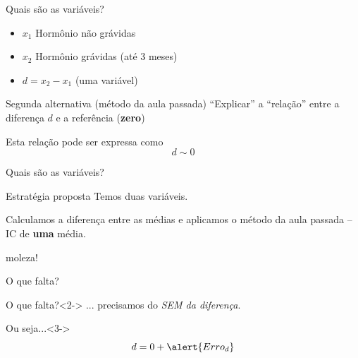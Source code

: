 \documentclass{beamer}
\begin{document}
\begin{frame}{Quais são as variáveis?}
  \begin{itemize}
  \item $x_1$ Hormônio não grávidas
  \item $x_2$ Hormônio grávidas (até 3 meses)
  \item $d = x_2 - x _1$ (uma variável)
  \end{itemize}
  \begin{block}{Segunda alternativa (método da aula passada)}
    \small
    ``Explicar'' a ``relação'' entre a diferença $d$ e a referência ({\bf zero})
  \end{block}
  \begin{block}{Esta relação pode ser expressa como}
    \begin{displaymath}
      d \sim 0
    \end{displaymath}
  \end{block}
\end{frame}

\begin{frame}{Quais são as variáveis?}
  \begin{block}{Estratégia proposta}
    Temos duas variáveis.

    \bigskip
    Calculamos a \alert{diferença} entre as médias e aplicamos o método da aula passada -- IC de {\bf uma} média.

    \begin{center}
      moleza!
    \end{center}
  \end{block}
  \begin{center}
    O que falta?
  \end{center}
  \begin{block}{O que falta?}<2->
    ... precisamos do {\em SEM da diferença}.
  \end{block}
  \begin{block}{Ou seja...}<3->
    \begin{displaymath}
      d = 0 + \alert{Erro_d}
    \end{displaymath}
  \end{block}

\end{frame}
\end{document}
